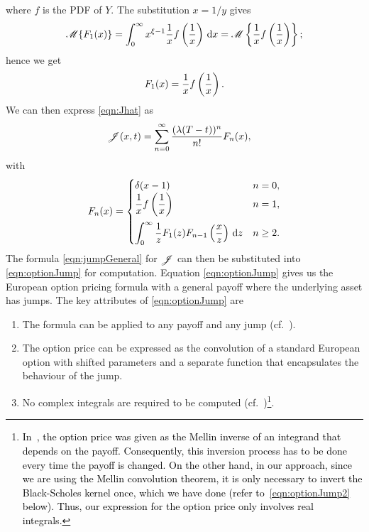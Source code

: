 where $f$ is the PDF of $Y$. The substitution $x = 1/y$ gives
	\begin{equation*}
		\mathscr M \{ F_1(x) \} = \int_0^\infty x^{\xi-1} \frac{1}{x}f\left( \frac{1}{x} \right) \, \mathrm d x = \mathscr M \left\{ \frac{1}{x} f\left( \frac{1}{x} \right) \right\};
	\end{equation*}
hence we get
	\begin{equation*}
		F_1(x) = \frac{1}{x}f\left(\frac{1}{x}\right).
	\end{equation*}
We can then express \eqref{eqn:Jhat} as
	\begin{align}
		\label{eqn:jumpGeneral}
		\begin{split}
		&\mathscr J(x,t) =  \displaystyle\sum\limits_{n=0}^{\infty} \frac{(\lambda(T-t))^n}{n!}F_n(x),
		\end{split}
	\end{align}
with
	\begin{equation}
		\label{eqn:Fn}
		F_n(x) =
			\begin{cases}
				\ds\delta(x-1) & n = 0, \\ \vspace{0.2cm}
				\ds\fr{1}{x}f\left(\fr{1}{x}\right) & n = 1, \\
				\ds\int_0^\infty \fr{1}{z}F_1(z)F_{n-1}\left(\fr{x}{z}\right) \, \d z & n \geq 2.
			\end{cases}
	\end{equation}
The formula \eqref{eqn:jumpGeneral} for $\mathscr J$ can then be substituted into \eqref{eqn:optionJump} for computation. Equation \eqref{eqn:optionJump} gives us the European option pricing formula with a general payoff where the underlying asset has jumps.
The key attributes of \eqref{eqn:optionJump} are
	\begin{enumerate}
		\item The formula can be applied to any payoff and any jump (cf.~\cite{Merton1976, Kou2002, Kou2004}).
		\item The option price can be expressed as the convolution of a standard European option with shifted parameters and a separate function that encapsulates the behaviour of the jump.
		\item No complex integrals are required to be computed (cf.~\cite{Frontczak2013})\footnote{\textcolor{black}{In~\cite{Frontczak2013}, the option price was given as the Mellin inverse of an integrand that depends on the payoff. Consequently, this inversion process has to be done every time the payoff is changed. On the other hand, in our approach, since we are using the Mellin convolution theorem, it is only necessary to invert the Black-Scholes kernel once, which we have done (refer to~\eqref{eqn:optionJump2} below). Thus, our expression for the option price only involves real integrals.}}.
	\end{enumerate}
